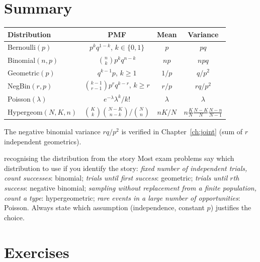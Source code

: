 \section{Summary}

\begin{center}
\begin{tabular}{@{}lccc@{}}
\toprule
Distribution & PMF & Mean & Variance\\
\midrule
Bernoulli$(p)$ & $p^k q^{1-k}$, $k\in\{0,1\}$ & $p$ & $pq$\\[0.3em]
Binomial$(n,p)$ & $\binom nk p^kq^{n-k}$ & $np$ & $npq$\\[0.3em]
Geometric$(p)$ & $q^{k-1}p$, $k\ge1$ & $1/p$ & $q/p^2$\\[0.3em]
NegBin$(r,p)$ & $\binom{k-1}{r-1}p^rq^{k-r}$, $k\ge r$ & $r/p$ & $rq/p^2$\\[0.3em]
Poisson$(\lambda)$ & $e^{-\lambda}\lambda^k/k!$ & $\lambda$ & $\lambda$\\[0.3em]
Hypergeom$(N,K,n)$ & $\binom Kk\binom{N-K}{n-k}/\binom Nn$ & $nK/N$ &
$n\frac KN\frac{N-K}N\frac{N-n}{N-1}$\\
\bottomrule
\end{tabular}
\end{center}

The negative binomial variance $rq/p^2$ is verified in Chapter~\ref{ch:joint}
(sum of $r$ independent geometrics).

\begin{interview}{recognising the distribution from the story}
Most exam problems say which distribution to use if you identify the story:
\emph{fixed number of independent trials, count successes}: binomial;
\emph{trials until first success}: geometric; \emph{trials until $r$th success}:
negative binomial; \emph{sampling without replacement from a finite population,
count a type}: hypergeometric; \emph{rare events in a large number of
opportunities}: Poisson. Always state which assumption (independence,
constant $p$) justifies the choice.
\end{interview}

\section*{Exercises}

